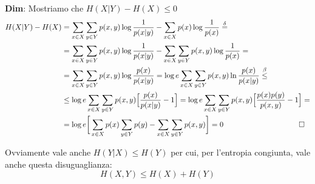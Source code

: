 \begin{tcolorbox}
\textbf{Dim}: Mostriamo che $H(X|Y) - H(X) \leq 0$
\begin{align*}
    H(X|Y) - H(X) &= \sum_{x \in X} \sum_{y \in Y} p(x,y) \log \frac{1}{p(x|y)} - \sum_{x \in X} p(x) \info{x} \overset{\delta}{=} \\
    &= \sum_{x \in X} \sum_{y \in Y} p(x,y) \log \frac{1}{p(x|y)} - \sum_{x \in X} \sum_{y \in Y} p(x,y) \info{x} =\\
    &= \sumx \sumy p(x,y) \log \frac{p(x)}{p(x|y)} = \log e \sumx \sumy p(x,y) \ln \frac{p(x)}{p(x|y)} \overset{\beta}{\leq} \\
    &\leq \log e \sumx \sumy p(x,y) \Big [ \frac{p(x)}{p(x|y)} - 1 \Big ] = \log e \sumx \sumy p(x,y) \Big [ \frac{p(x)p(y)}{p(x,y)} - 1 \Big] = \\ 
    &= \log e \bigg [ \sumx p(x) \sumy p(y) - \sumx \sumy p(x,y) \bigg] = 0 \hspace{100pt} \square
\end{align*}
\end{tcolorbox}
Ovviamente vale anche $H(Y|X) \leq H(Y)$ per cui, per l'entropia congiunta, vale anche questa disuguaglianza:
\begin{equation}
\label{eqn:leq}
    H(X,Y) \leq H(X) + H(Y)
\end{equation}

